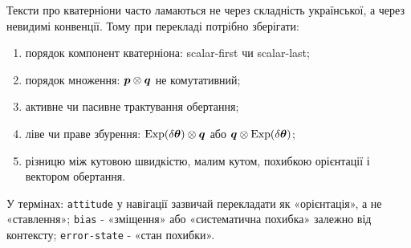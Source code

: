 Тексти про кватерніони часто ламаються не через складність української, а через невидимі конвенції. Тому при перекладі потрібно зберігати:

\begin{enumerate}[label=\arabic*.]
  \item порядок компонент кватерніона: scalar-first чи scalar-last;
  \item порядок множення: $\bm{p}\otimes\bm{q}$ не комутативний;
  \item активне чи пасивне трактування обертання;
  \item ліве чи праве збурення: $\operatorname{Exp}(\delta\bm{\theta})\otimes\bm{q}$ або $\bm{q}\otimes\operatorname{Exp}(\delta\bm{\theta})$;
  \item різницю між кутовою швидкістю, малим кутом, похибкою орієнтації і вектором обертання.
\end{enumerate}

У термінах: \texttt{attitude} у навігації зазвичай перекладати як «орієнтація», а не «ставлення»; \texttt{bias} - «зміщення» або «систематична похибка» залежно від контексту; \texttt{error-state} - «стан похибки».

